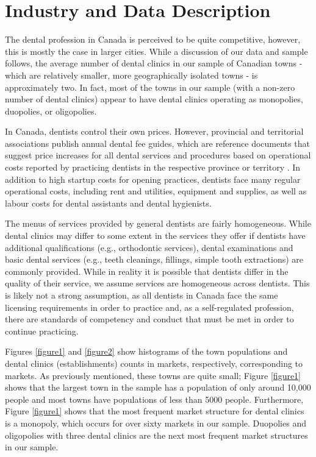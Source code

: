 \documentclass[a4paper,11pt]{article}
\begin{document}
\section{Industry and Data Description}
The dental profession in Canada is perceived to be quite competitive, however, this is mostly the case in larger cities. While a discussion of our data and sample follows, the average number of dental clinics in our sample of Canadian towns - which are relatively smaller, more geographically isolated towns - is approximately two. In fact, most of the towns in our sample (with a non-zero number of dental clinics) appear to have dental clinics operating as monopolies, duopolies, or oligopolies.

In Canada, dentists control their own prices. However, provincial and territorial associations publish annual dental fee guides, which are reference documents that suggest price increases for all dental services and procedures based on operational costs reported by practicing dentists in the respective province or territory \citep{Rolfe}. In addition to high startup costs for opening practices, dentists face many regular operational costs, including rent and utilities, equipment and supplies, as well as labour costs for dental assistants and dental hygienists.

The menus of services provided by general dentists are fairly homogeneous. While dental clinics may differ to some extent in the services they offer if dentists have additional qualifications (e.g., orthodontic services), dental examinations and basic dental services (e.g., teeth cleanings, fillings, simple tooth extractions) are commonly provided. While in reality it is possible that dentists differ in the quality of their service, we assume services are homogeneous across dentists. This is likely not a strong assumption, as all dentists in Canada face the same licensing requirements in order to practice and, as a self-regulated profession, there are standards of competency and conduct that must be met in order to continue practicing.


Figures \ref{figure1} and \ref{figure2} show histograms of the town populations and dental clinics (establishments) counts in markets, respectively, corresponding to markets. As previously mentioned, these towns are quite small; Figure \ref{figure1} shows that the largest town in the sample has a population of only around 10,000 people and most towns have populations of less than 5000 people. Furthermore, Figure \ref{figure1} shows that the most frequent market structure for dental clinics is a monopoly, which occurs for over sixty markets in our sample. Duopolies and oligopolies with three dental clinics are the next most frequent market structures in our sample.
\end{document}
